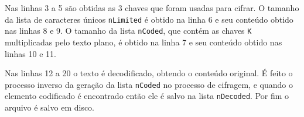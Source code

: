 Nas linhas 3 a 5 são obtidas as 3 chaves que foram usadas para cifrar. O tamanho da lista de caracteres únicos \texttt{nLimited} é obtido na linha 6 e seu conteúdo obtido nas linhas 8 e 9. O tamanho da lista \texttt{nCoded}, que contém as chaves \texttt{K} multiplicadas pelo texto plano, é obtido na linha 7 e seu conteúdo obtido nas linhas 10 e 11.

Nas linhas 12 a 20 o texto é decodificado, obtendo o conteúdo original. É feito o processo inverso da geração da lista \texttt{nCoded} no processo de cifragem, e quando o elemento codificado é encontrado então ele é salvo na lista \texttt{nDecoded}. Por fim o arquivo é salvo em disco.